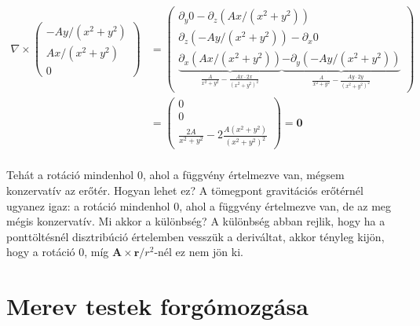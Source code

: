 \documentclass[12pt,a4paper]{scrartcl}
\let\mathbf\bm
\begin{document}
\[\begin{aligned}
  \nabla  \times \left( {\begin{array}{*{20}{c}}
  { - Ay/\left( {{x^2} + {y^2}} \right)} \\ 
  {Ax/\left( {{x^2} + {y^2}} \right)} \\ 
  0 
\end{array}} \right) &  = \left( {\begin{array}{*{20}{c}}
  {{\partial _y}0 - {\partial _z}\left( {Ax/\left( {{x^2} + {y^2}} \right)} \right)} \\ 
  {{\partial _z}\left( { - Ay/\left( {{x^2} + {y^2}} \right)} \right) - {\partial _x}0} \\ 
  {\underbrace {{\partial _x}\left( {Ax/\left( {{x^2} + {y^2}} \right)} \right)}_{\frac{A}{{{x^2} + {y^2}}} - \frac{{Ax \cdot 2x}}{{{{\left( {{x^2} + {y^2}} \right)}^2}}}}\underbrace { - {\partial _y}\left( { - Ay/\left( {{x^2} + {y^2}} \right)} \right)}_{\frac{A}{{{x^2} + {y^2}}} - \frac{{Ay \cdot 2y}}{{{{\left( {{x^2} + {y^2}} \right)}^2}}}}} 
\end{array}} \right) \\ 
   &  = \left( {\begin{array}{*{20}{c}}
  0 \\ 
  0 \\ 
  {\frac{{2A}}{{{x^2} + {y^2}}} - 2\frac{{A\left( {{x^2} + {y^2}} \right)}}{{{{\left( {{x^2} + {y^2}} \right)}^2}}}} 
\end{array}} \right) = {\mathbf{0}} \\ 
\end{aligned} \]

Tehát a rotáció mindenhol 0, ahol a függvény értelmezve van, mégsem konzervatív az erőtér. Hogyan lehet ez? A  tömegpont gravitációs erőtérnél ugyanez igaz: a rotáció mindenhol 0, ahol a függvény értelmezve van, de az meg mégis konzervatív. Mi akkor a különbség? A különbség abban rejlik, hogy ha a ponttöltésnél disztribúció értelemben vesszük a deriváltat, akkor tényleg kijön, hogy a rotáció 0, míg ${\mathbf{A}} \times {\mathbf{r}}/{r^2}$-nél ez nem jön ki.

\section{Merev testek forgómozgása}
\end{document}
